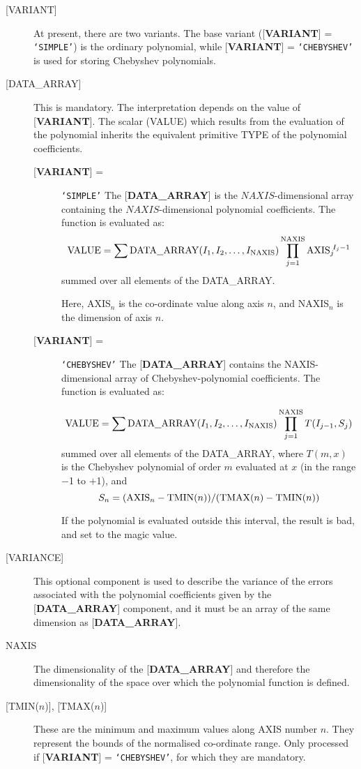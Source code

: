 \begin{description}
\item [{[}VARIANT{]}] At present, there are
two variants. The base variant
({[}{\bf VARIANT}{]} = {\tt `SIMPLE'}) is the ordinary polynomial,
while
{[}{\bf VARIANT}{]} = {\tt `CHEBYSHEV'} is used
for storing Chebyshev polynomials.
\item [{[}DATA\_ARRAY{]}]  This is mandatory.  The
interpretation depends on the value
of {[}{\bf VARIANT}{]}.  The
scalar (VALUE) which results from the
evaluation of the polynomial inherits the equivalent primitive TYPE
of the polynomial coefficients.

\begin{description}
\item [{[}{\bf VARIANT}{]} =] {\tt `SIMPLE'}
The {[}{\bf DATA\_ARRAY}{]} is the $NAXIS$-dimensional array containing
the $NAXIS$-di\-men\-sion\-al poly\-no\-mial
co\-efficients.  The function is evaluated as:
\[{\rm VALUE} = \sum {\rm DATA\underline{~~}ARRAY}(I_1,I_2,\ldots,I_{\rm NAXIS}) \prod_{j=1}^{\rm NAXIS} {\rm AXIS}_j\!^{I_j-1} \]
summed over all elements of the DATA\_ARRAY.

Here, AXIS$_n$ is the co-ordinate value along axis $n$, and
NAXIS$_n$ is the dimension of axis $n$.

\item [{[}{\bf VARIANT}{]} =] {\tt `CHEBYSHEV'}
The {[}{\bf DATA\_ARRAY}{]} contains the NAXIS-dimensional
array of Chebyshev-polynomial coefficients.  The function is evaluated as: 

\[{\rm VALUE}=\sum {\rm DATA\underline{~~}ARRAY}(I_1,I_2,\ldots,I_{\rm NAXIS})\prod_{j=1}^{\rm NAXIS} T(I_{j-1},S_j) \]
summed over all elements of the DATA\_ARRAY, where
$T(m,x)$ is the Chebyshev polynomial of order $m$ evaluated at
$x$ (in the range $-$1 to $+$1),
and
\[ S_n = ({\rm AXIS}_n - {\rm TMIN}(n))/({\rm TMAX}(n) - {\rm TMIN}(n)) \]

If the polynomial is evaluated outside this interval, the result is bad, and set
to the magic value.
\end{description}
\item [{[}VARIANCE{]}]
This optional component is used to describe the variance of the
errors associated with the polynomial coefficients given
by the {[}{\bf DATA\_ARRAY}{]} component, and
it must be an array of the same
dimension as {[}{\bf DATA\_ARRAY}{]}.
\item [NAXIS]
The dimensionality of the
{[}{\bf DATA\_ARRAY}{]} and therefore the dimensionality
of the space over which the polynomial function is defined.
\item [{[}TMIN{\rm ($n$)}{]}, {[}TMAX{\rm ($n$)}{]}]
These are the minimum and maximum values along
AXIS number $n$.  They represent the bounds of the normalised
co-ordinate range.  Only processed if
{[}{\bf VARIANT}{]} = {\tt `CHEBYSHEV'}, for which they are mandatory.
\end{description}


